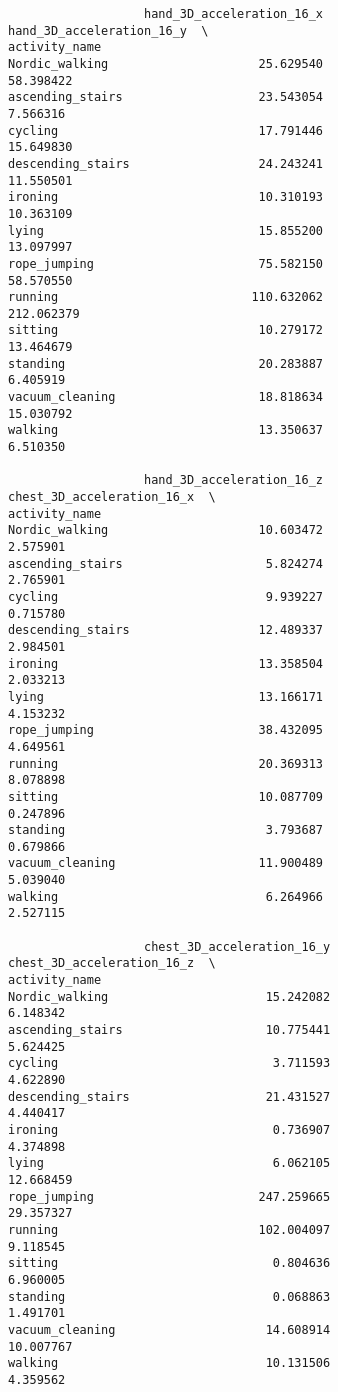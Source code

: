\documentclass[11pt]{article}
\begin{document}
    
    \begin{verbatim}
                   hand_3D_acceleration_16_x  hand_3D_acceleration_16_y  \
activity_name                                                             
Nordic_walking                     25.629540                  58.398422   
ascending_stairs                   23.543054                   7.566316   
cycling                            17.791446                  15.649830   
descending_stairs                  24.243241                  11.550501   
ironing                            10.310193                  10.363109   
lying                              15.855200                  13.097997   
rope_jumping                       75.582150                  58.570550   
running                           110.632062                 212.062379   
sitting                            10.279172                  13.464679   
standing                           20.283887                   6.405919   
vacuum_cleaning                    18.818634                  15.030792   
walking                            13.350637                   6.510350   

                   hand_3D_acceleration_16_z  chest_3D_acceleration_16_x  \
activity_name                                                              
Nordic_walking                     10.603472                    2.575901   
ascending_stairs                    5.824274                    2.765901   
cycling                             9.939227                    0.715780   
descending_stairs                  12.489337                    2.984501   
ironing                            13.358504                    2.033213   
lying                              13.166171                    4.153232   
rope_jumping                       38.432095                    4.649561   
running                            20.369313                    8.078898   
sitting                            10.087709                    0.247896   
standing                            3.793687                    0.679866   
vacuum_cleaning                    11.900489                    5.039040   
walking                             6.264966                    2.527115   

                   chest_3D_acceleration_16_y  chest_3D_acceleration_16_z  \
activity_name                                                               
Nordic_walking                      15.242082                    6.148342   
ascending_stairs                    10.775441                    5.624425   
cycling                              3.711593                    4.622890   
descending_stairs                   21.431527                    4.440417   
ironing                              0.736907                    4.374898   
lying                                6.062105                   12.668459   
rope_jumping                       247.259665                   29.357327   
running                            102.004097                    9.118545   
sitting                              0.804636                    6.960005   
standing                             0.068863                    1.491701   
vacuum_cleaning                     14.608914                   10.007767   
walking                             10.131506                    4.359562   


\end{verbatim}
\end{document}
